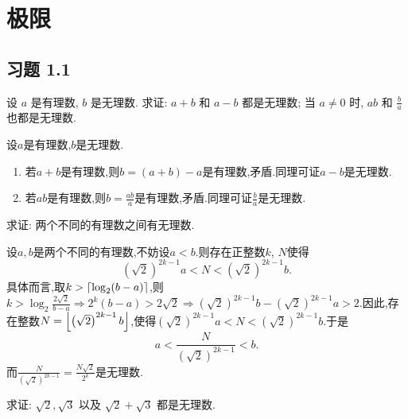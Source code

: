 \chapter{极限}

\section{习题 1.1}

\begin{exercise}[1.1.1]
    设 $a$ 是有理数, $b$ 是无理数. 求证: $a+b$ 和 $a-b$ 都是无理数; 当 $a \ne 0$ 时, $ab$ 和 $\frac{b}{a}$ 也都是无理数.
\end{exercise}

\begin{solution}
    设$a$是有理数,$b$是无理数.
    \begin{enumerate}[(1)]
        \item 若$a+b$是有理数,则$b = (a+b)-a$是有理数,矛盾.同理可证$a-b$是无理数.
        \item 若$ab$是有理数,则$b = \frac{ab}{a}$是有理数,矛盾.同理可证$\frac{b}{a}$是无理数.
    \end{enumerate}
\end{solution}

\begin{exercise}[1.1.2]
    求证: 两个不同的有理数之间有无理数.
\end{exercise}

\begin{solution}
    设$a,b$是两个不同的有理数,不妨设$a < b$.则存在正整数$k$, $N$使得
    $$\left( \sqrt{2} \right)^{2k-1} a < N < \left( \sqrt{2} \right)^{2k-1} b.$$
    具体而言,取$k > \llceil \log_2 (b-a) \rrceil$,则$k > \log_2 \frac{2 \sqrt{2}}{b-a} \Rightarrow 2^k(b-a) > 2 \sqrt{2} \Rightarrow \left( \sqrt{2} \right)^{2k-1} b - \left( \sqrt{2} \right)^{2k-1} a > 2$.因此,存在整数$N = \llfloor \left( \sqrt{2} \right)^{2k-1} b \rrfloor$,使得$\left( \sqrt{2} \right)^{2k-1} a < N < \left( \sqrt{2} \right)^{2k-1} b$.于是
    $$a < \frac{N}{\left( \sqrt{2} \right)^{2k-1}} < b.$$
    而$\frac{N}{\left( \sqrt{2} \right)^{2k-1}} = \frac{N \sqrt{2}}{2^k}$是无理数.
\end{solution}

\begin{exercise}[1.1.3]
    求证: $\sqrt{2}, \sqrt{3}$ 以及 $\sqrt{2}+\sqrt{3}$ 都是无理数.
\end{exercise}

